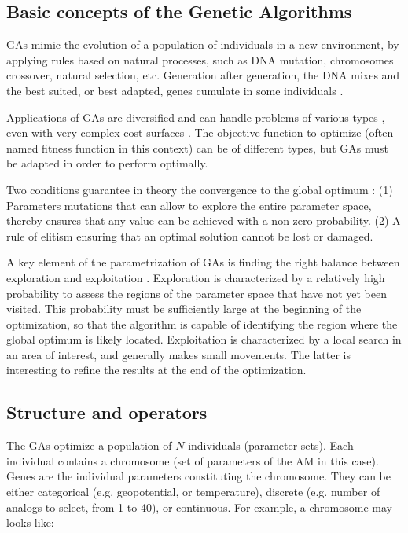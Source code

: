 \documentclass{ametsoc}
\begin{document}
\subsection{Basic concepts of the Genetic Algorithms}

GAs mimic the evolution of a population of individuals in a new environment, by applying rules based on natural processes, such as DNA mutation, chromosomes crossover, natural selection, etc. Generation after generation, the DNA mixes and the best suited, or best adapted, genes cumulate in some individuals \citep{Beasley1996a}.

Applications of GAs are diversified and can handle problems of various types \citep{Joines1996a}, even with very complex cost surfaces \citep{Haupt2004}. The objective function to optimize (often named fitness function in this context) can be of different types, but GAs must be adapted in order to perform optimally.

Two conditions guarantee in theory the convergence to the global optimum \citep{Zitzler2004a}: (1) Parameters mutations that can allow to explore the entire parameter space, thereby ensures that any value can be achieved with a non-zero probability. (2) A rule of elitism ensuring that an optimal solution cannot be lost or damaged.

A key element of the parametrization of GAs is finding the right balance between exploration and exploitation \citep{Back1992a, Smith1997a}. Exploration is characterized by a relatively high probability to assess the regions of the parameter space that have not yet been visited. This probability must be sufficiently large at the beginning of the optimization, so that the algorithm is capable of identifying the region where the global optimum is likely located. Exploitation is characterized by a local search in an area of interest, and generally makes small movements. The latter is interesting to refine the results at the end of the optimization.


\subsection{Structure and operators}

The GAs optimize a population of $N$ individuals (parameter sets). Each individual contains a chromosome (set of parameters of the AM in this case). Genes are the individual parameters constituting the chromosome. They can be either categorical (e.g. geopotential, or temperature), discrete (e.g. number of analogs to select, from 1 to 40), or continuous. For example, a chromosome may looks like:
\end{document}
